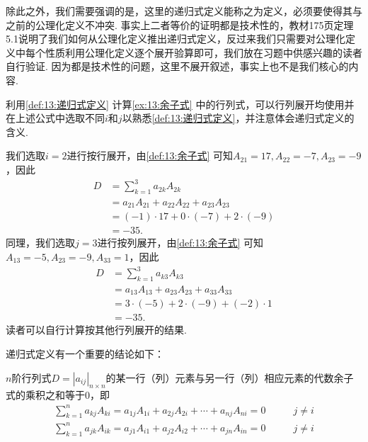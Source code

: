 除此之外，我们需要强调的是，这里的递归式定义能称之为定义，必须要使得其与之前的公理化定义不冲突. 事实上二者等价的证明都是技术性的，教材175页定理5.1说明了我们如何从公理化定义推出递归式定义，反过来我们只需要对公理化定义中每个性质利用公理化定义逐个展开验算即可，我们放在习题中供感兴趣的读者自行验证. 因为都是技术性的问题，这里不展开叙述，事实上也不是我们核心的内容.
\begin{example} \label{ex:13:递归式定义}
    利用\autoref{def:13:递归式定义} 计算\autoref{ex:13:余子式} 中的行列式，可以行列展开均使用并在上述公式中选取不同$i$和$j$以熟悉\autoref*{def:13:递归式定义}，并注意体会递归式定义的含义.
\end{example}

\begin{solution}
    我们选取$i=2$进行按行展开，由\autoref{def:13:余子式} 可知$A_{21}=17,A_{22}=-7,A_{23}=-9$，因此
    \begin{align*}
        D &=\sum_{k=1}^{3}a_{2k}A_{2k} \\
          &=a_{21}A_{21}+a_{22}A_{22}+a_{23}A_{23} \\
          &=(-1) \cdot 17+0 \cdot (-7)+2 \cdot (-9) \\
          &=-35.
    \end{align*}
    同理，我们选取$j=3$进行按列展开，由\autoref{def:13:余子式} 可知$A_{13}=-5,A_{23}=-9,A_{33}=1$，因此
    \begin{align*}
        D &=\sum_{k=1}^{3}a_{k3}A_{k3} \\
          &=a_{13}A_{13}+a_{23}A_{23}+a_{33}A_{33} \\
          &=3 \cdot (-5)+2 \cdot (-9)+(-2) \cdot 1 \\
          &=-35.
    \end{align*}
    读者可以自行计算按其他行列展开的结果.
\end{solution}

递归式定义有一个重要的结论如下：
\begin{theorem}
    $n$阶行列式$D=|a_{ij}|_{n \times n}$的某一行（列）元素与另一行（列）相应元素的代数余子式的乘积之和等于0，即
    \begin{align}
        \label{eq:13:递归式定义3}
        \sum_{k=1}^{n}a_{kj}A_{ki}=a_{1j}A_{1i}+a_{2j}A_{2i}+\cdots+a_{nj}A_{ni}=0 & \qquad j \neq i \\
        \label{eq:13:递归式定义4}
        \sum_{k=1}^{n}a_{jk}A_{ik}=a_{j1}A_{i1}+a_{j2}A_{i2}+\cdots+a_{jn}A_{in}=0 & \qquad j \neq i
    \end{align}
\end{theorem}

